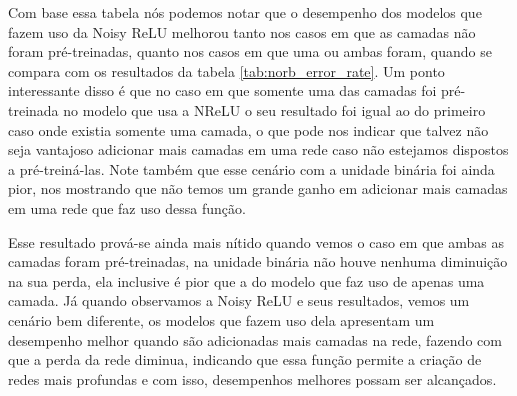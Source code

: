 Com base essa tabela nós podemos notar que o desempenho dos modelos que fazem uso da Noisy ReLU melhorou tanto nos casos em que as camadas não foram pré-treinadas, quanto nos casos em que uma ou ambas foram, quando se compara com os resultados da tabela \ref{tab:norb_error_rate}. Um ponto interessante disso é que no caso em que somente uma das camadas foi pré-treinada no modelo que usa a NReLU o seu resultado foi igual ao do primeiro caso onde existia somente uma camada, o que pode nos indicar que talvez não seja vantajoso adicionar mais camadas em uma rede caso não estejamos dispostos a pré-treiná-las. Note também que esse cenário com a unidade binária foi ainda pior, nos mostrando que não temos um grande ganho em adicionar mais camadas em uma rede que faz uso dessa função.

Esse resultado prová-se ainda mais nítido quando vemos o caso em que ambas as camadas foram pré-treinadas, na unidade binária não houve nenhuma diminuição na sua perda, ela inclusive é pior que a do modelo que faz uso de apenas uma camada. Já quando observamos a Noisy ReLU e seus resultados, vemos um cenário bem diferente, os modelos que fazem uso dela apresentam um desempenho melhor quando são adicionadas mais camadas na rede, fazendo com que a perda da rede diminua, indicando que essa função permite a criação de redes mais profundas e com isso, desempenhos melhores possam ser alcançados.

